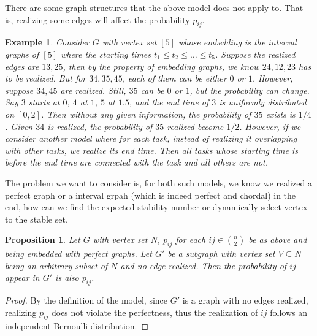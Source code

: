 \documentclass[10pt,leqno]{amsart}
\newtheorem{example}[theorem]{Example}
\newtheorem{proposition}[theorem]{Proposition}
\begin{document}
There are some graph structures that the above model does not apply to.
That is, realizing some edges will affect the probability $p_{ij}$.
\begin{example}
    Consider $G$ with vertex set $[5]$ whose embedding is the interval graphs of $[5]$ where the starting times $t_1\leq t_2\leq\ldots\leq t_5$.
    Suppose the realized edges are $13,25$, then by the property of embedding graphs,
     we know $24,12,23$ has to be realized.
     But for $34,35,45$, each of them can be either $0$ or $1$.
     However, suppose $34,45$ are realized. 
     Still, $35$ can be $0$ or $1$, but the probability can change.
     Say $3$ starts at $0$, $4$ at $1$, $5$ at $1.5$, and the end time of $3$ is uniformly distributed on $[0,2]$.
     Then without any given information, the probability of $35$ exists is $1/4$.
     Given $34$ is realized, the probability of $35$ realized become $1/2$.
     However, if we consider another model where for each task, instead of realizing it overlapping with other tasks, we realize its end time.
     Then all tasks whose starting time is before the end time are connected with the task and all others are not.
\end{example}
The problem we want to consider is, for both such models, we know we realized a perfect graph or a interval grpah (which is indeed perfect and chordal) in the end, how can we find the expected stability number or dynamically select vertex to the stable set.

\begin{proposition}
    Let $G$ with vertex set $N$, $p_{ij}$ for each $ij\in \binom{n}{2}$ be as above and being embedded with perfect graphs.
    Let $G'$ be a subgraph with vertex set $V\subseteq N$ being an arbitrary subset of $N$ and no edge realized.
    Then the probability of $ij$ appear in $G'$ is also $p_{ij}$.
\end{proposition}
\begin{proof}
    By the definition of the model, since $G'$ is a graph with no edges realized, realizing $p_{ij}$ does not violate the perfectness, thus the realization of $ij$ follows an independent Bernoulli distribution.
\end{proof}
\end{document}
